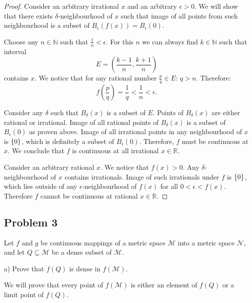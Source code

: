 \documentclass{article}
\newcommand{\R}{\mathbb{R}}
\newcommand{\N}{\mathbb{N}}
\DeclarePairedDelimiter{\set}{ \{ }{ \} }
\begin{document}
\begin{proof}

Consider an arbitrary irrational $x$ and an arbitrary $\epsilon>0$.
We will show that there exists $\delta$-neighbourhood of $x$ such that image of all points from such neighbourhood is a subset of $B_{\epsilon}(f(x)) = B_{\epsilon}(0)$.

Choose any $n \in \N$ such that $\frac{1}{n} < \epsilon$.
For this $n$ we can always find $k \in \N$ such that interval
\[ E = \left( \frac{k-1}{n}, \frac{k+1}{n} \right) \]
contains $x$.
We notice that for any rational number $\frac{p}{q} \in E$: $q > n $.
Therefore:
\[ f \left( \frac{p}{q} \right) = \frac{1}{q} < \frac{1}{n} < \epsilon. \]

Consider any $\delta$ such that $B_{\delta}(x)$ is a subset of $E$.
Points of $B_{\delta}(x)$ are either rational or irrational.
Image of all rational points of $B_{\delta}(x)$ is a subset of $B_{\epsilon}(0)$ as proven above.
Image of all irrational points in any neighbourhood of $x$ is $\set{0}$, which is definitely a subset of $B_{\epsilon}(0)$.
Therefore, $f$ must be continuous at $x$.
We conclude that $f$ is continuous at all irrational $x \in \R$.

Consider an arbitrary rational $x$.
We notice that $f(x)>0$.
Any $\delta$-neighbourhood of $x$ contains irrationals.
Image of such irrationals under $f$ is $\set{0}$, which lies outside of any $\epsilon$-neighbourhood of $f(x)$ for all $0 < \epsilon < f(x)$.
Therefore $f$ cannot be continuous at rational $x \in \R$.

\end{proof}


\subsection*{Problem 3}

\begin{tcolorbox}
Let $f$ and $g$ be continuous mappings of a metric space $\mathcal{M}$ into a metric space $\mathcal{N}$, and let $Q \subseteq \mathcal{M}$ be a dense subset of $\mathcal{M}$.

a) Prove that $f(Q)$ is dense in $f(\mathcal{M})$.
\end{tcolorbox}

We will prove that every point of $f(\mathcal{M})$ is either an element of $f(Q)$ or a limit point of $f(Q)$.
\end{document}
